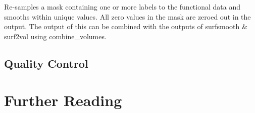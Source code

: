 \documentclass[final,titlepage,letterpaper,oneside,12pt]{article}
\renewcommand{\texttt}[2][BrickRed]{\textcolor{#1}{\ttfamily #2}}%
\begin{document}
\noindent Re-samples a mask containing one or more labels to the functional data and smooths within unique values. All zero values in the mask are zeroed out in the output. The output of this can be combined with the outputs of \texttt{surfsmooth} \& \texttt{surf2vol} using \texttt{combine\_volumes}.

\subsection{Quality Control}

\section{Further Reading}

\newpage 


\end{document}
